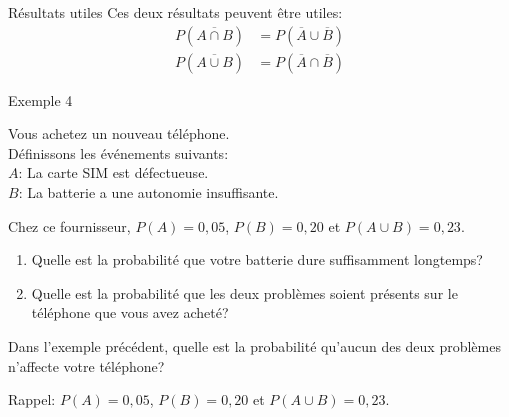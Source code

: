 \documentclass{BeamerTemplate}
\begin{document}
\begin{frame}[t]{Résultats utiles}
    Ces deux résultats peuvent être utiles:
    \begin{align*}
        P(\overline{A\cap B}) &= P(\overline{A} \cup \overline{B})\\
        P(\overline{A\cup B}) &= P(\overline{A} \cap \overline{B})
    \end{align*}
\end{frame}
\begin{frame}[t]{Exemple 4}

\begin{minipage}{8cm}{
\small
Vous achetez un nouveau téléphone. \\
Définissons les événements suivants:\\
$A$: La carte SIM est défectueuse.\\
$B$: La batterie a une autonomie insuffisante.\\
}
\end{minipage}

\vspace{.3cm}

Chez ce fournisseur, $P(A)=0,05$, $P(B)=0,20$ et $P(A \cup B)=0,23$.

\begin{enumerate}[{a)}]\itemsep1cm
  \item Quelle est la probabilité que votre batterie dure suffisamment longtemps?
  \item Quelle est la probabilité que les deux problèmes soient présents sur le téléphone que vous avez acheté?
\end{enumerate}
\end{frame}
\begin{frame}[plain,t]


\QuizBanner

Dans l'exemple précédent, quelle est la probabilité qu'aucun des deux problèmes n'affecte votre téléphone?

 \bigskip



 \bigskip
Rappel:   $P(A)=0,05$, $P(B)=0,20$ et $P(A \cup B)=0,23$.
\vspace{3cm}

\end{frame}
\end{document}

